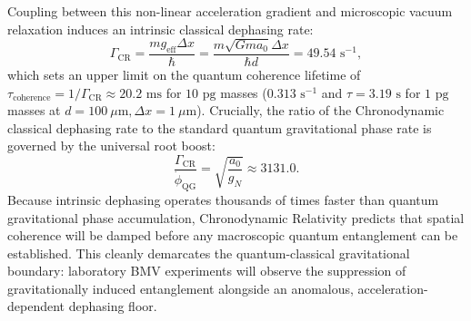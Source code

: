 \documentclass[aps,prd,reprint,superscriptaddress,nofootinbib,twocolumn,floatfix]{revtex4-2}
\begin{document}
Coupling between this non-linear acceleration gradient and microscopic vacuum relaxation induces an intrinsic classical dephasing rate:
\begin{equation}
\Gamma_{\text{CR}} = \frac{m g_{\text{eff}} \Delta x}{\hbar} = \frac{m \sqrt{G m a_0} \Delta x}{\hbar d} = 49.54\text{ s}^{-1},
\label{eq:cr_dephasing_rate}
\end{equation}
which sets an upper limit on the quantum coherence lifetime of $\tau_{\text{coherence}} = 1/\Gamma_{\text{CR}} \approx 20.2\text{ ms}$ for $10\text{ pg}$ masses ($0.313\text{ s}^{-1}$ and $\tau = 3.19\text{ s}$ for $1\text{ pg}$ masses at $d = 100\ \mu\text{m}, \Delta x = 1\ \mu\text{m}$). Crucially, the ratio of the Chronodynamic classical dephasing rate to the standard quantum gravitational phase rate is governed by the universal root boost:
\begin{equation}
\frac{\Gamma_{\text{CR}}}{\dot{\phi}_{\text{QG}}} = \sqrt{\frac{a_0}{g_N}} \approx 3131.0.
\end{equation}
Because intrinsic dephasing operates thousands of times faster than quantum gravitational phase accumulation, Chronodynamic Relativity predicts that spatial coherence will be damped before any macroscopic quantum entanglement can be established. This cleanly demarcates the quantum-classical gravitational boundary: laboratory BMV experiments will observe the suppression of gravitationally induced entanglement alongside an anomalous, acceleration-dependent dephasing floor.
\end{document}
